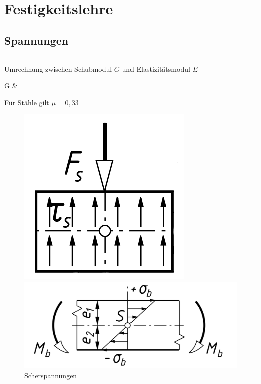 \section{Festigkeitslehre}
\subsection{Spannungen}
\hrule
\begin{eeqn}{Umrechnung zwischen Schubmodul $G$ und Elastizitätsmodul $E$}
 		\begin{flalign}
 			G &= 
		\end{flalign}
		Für Stähle gilt $\mu=0,33$
\end{eeqn}
\begin{figure}[H]
	\begin{minipage}[b]{0.22\linewidth}
		\includegraphics[width=\linewidth]{festigkeitslehre/scherung}
		\caption*{Scherspannungen}
	\end{minipage}
	\begin{minipage}[b]{0.5\linewidth}
		\includegraphics[width=\linewidth]{festigkeitslehre/biegung}

\end{minipage}
\end{figure}
